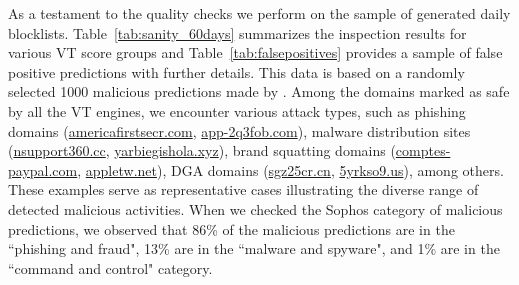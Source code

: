 \begin{table}
\centering
\caption{Sanity Checking Results After 60 Days.}
\label{tab:sanity_60days}
\end{table}

As a testament to the quality checks we perform on the sample of generated daily blocklists.
Table~\ref{tab:sanity_60days} summarizes the inspection results for various VT score groups and Table~\ref{tab:falsepositives} provides a sample of false positive predictions with further details.
This data is based on a randomly selected 1000 malicious predictions made by \system.
Among the domains marked as safe by all the VT engines, we encounter various attack types, such as phishing domains (\url{americafirstsecr.com}, \url{app-2q3fob.com}), malware distribution sites (\url{nsupport360.cc}, \url{yarbiegishola.xyz}), brand squatting domains (\url{comptes-paypal.com}, \url{appletw.net}), DGA domains (\url{sgz25cr.cn}, \url{5yrkso9.us}), among others. 
These examples serve as representative cases illustrating the diverse range of detected malicious activities.
When we checked the Sophos category of malicious predictions, we observed that 86\% of the malicious predictions are in the ``phishing and fraud", 13\% are in the ``malware and spyware", and 1\% are in the ``command and control" category.








